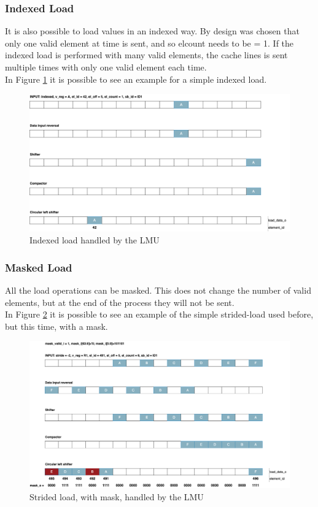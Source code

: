 \subsubsection{Indexed Load}
It is also possible to load values in an indexed way. By design was chosen that only one valid element at time is sent, and so el\+count needs to be = 1. If the indexed load is performed with many valid elements, the cache lines is sent multiple times with only one valid element each time.\\

In Figure \ref{lmu-indexed} it is possible to see an example for a simple indexed load.

\begin{figure}[H]
    \centering
    \includegraphics[scale = 0.25]{Chapter_2/img/lmu-indexed.png}
    \caption{Indexed load handled by the LMU}
    \label{lmu-indexed}
\end{figure}

\subsubsection{Masked Load}
All the load operations can be masked. This does not change the number of valid elements, but at the end of the process they will not be sent.\\


In Figure \ref{lmu-masked-stride} it is possible to see an example of the simple strided-load used before, but this time, with a mask.

\begin{figure}[H]
    \centering
    \includegraphics[scale = 0.25]{Chapter_2/img/lmu-masked-strided.png}
    \caption{Strided load, with mask, handled by the LMU}
    \label{lmu-masked-stride}
\end{figure}

